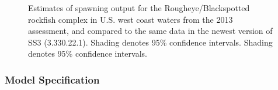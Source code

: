 \documentclass[
]{scrartcl}
\begin{document}
\begin{figure}


\caption{\label{fig-SO_2013}Estimates of spawning output for the
Rougheye/Blackspotted rockfish complex in U.S. west coast waters from
the 2013 assessment, and compared to the same data in the newest version
of SS3 (3.330.22.1). Shading denotes 95\% confidence intervals. Shading
denotes 95\% confidence intervals.}

\end{figure}%

\newpage

\subsubsection{Model Specification}\label{model-specification}
\end{document}
